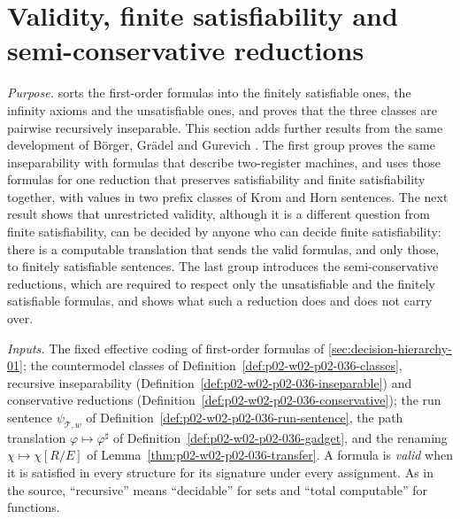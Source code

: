 \section{Validity, finite satisfiability and semi-conservative reductions}
\label{sec:p02-w02b-p02-031-validity-finsat}

\emph{Purpose.}   sorts the
first-order formulas into the finitely satisfiable ones, the infinity axioms
and the unsatisfiable ones, and proves that the three classes are pairwise
recursively inseparable.  This section adds further results from the same
development of Börger, Grädel and Gurevich
\cite[Sect.~2.1.2, pp.~36--38]{BorgerGradelGurevich1997}.  The first group
proves the same inseparability with formulas that describe two-register
machines, and uses those formulas for one reduction that preserves
satisfiability and finite satisfiability together, with values in two prefix
classes of Krom and Horn sentences.  The next result shows
that unrestricted validity, although it is a different question from finite
satisfiability, can be decided by anyone who can decide finite
satisfiability: there is a computable translation that sends the valid
formulas, and only those, to finitely satisfiable sentences.  The last group
introduces the semi-conservative reductions, which are required to respect
only the unsatisfiable and the finitely satisfiable formulas, and shows what
such a reduction does and does not carry over.

\emph{Inputs.}  The fixed effective coding of first-order formulas of
\cref{sec:decision-hierarchy-01}; the countermodel classes of
Definition~\ref{def:p02-w02-p02-036-classes}, recursive inseparability
(Definition~\ref{def:p02-w02-p02-036-inseparable}) and conservative
reductions (Definition~\ref{def:p02-w02-p02-036-conservative}); the run
sentence \(\psi_{\mathcal T,w}\) of
Definition~\ref{def:p02-w02-p02-036-run-sentence}, the path translation
\(\varphi\mapsto\varphi^{\sharp}\) of
Definition~\ref{def:p02-w02-p02-036-gadget}, and the renaming
\(\chi\mapsto\chi[R/E]\) of Lemma~\ref{thm:p02-w02-p02-036-transfer}.  A formula
is \emph{valid} when it is satisfied in every structure for its signature
under every assignment.  As in the source, ``recursive'' means
``decidable'' for sets and ``total computable'' for functions.

